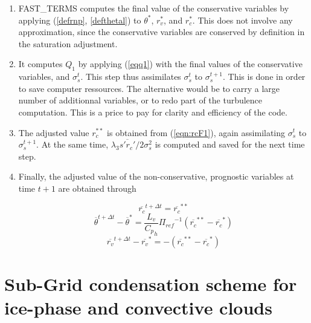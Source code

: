 \begin{enumerate}
\item FAST\_TERMS computes the final value of the conservative variables
by applying (\ref{defrnp}, \ref{defthetal}) to $\theta^*$, $r_v^*$,
and $r_c^*$.
This does not involve any approximation, since the conservative variables
are conserved by definition in the saturation adjustment.

\item It computes $Q_1$ by applying (\ref{eqq1}) with the final values of
the conservative variables, and $\sigma_s^t$. This step thus assimilates
$\sigma_s^t$ to $\sigma_s^{t+1}$. This is done in order to save computer
ressources. The alternative would be to carry a large number of additionnal
variables, or to redo part of the turbulence computation. This is a price
to pay for clarity and efficiency of the code.

\item The adjusted value $r_c^{**}$ is obtained from (\ref{eqn:rcF1}), again
assimilating $\sigma_s^t$ to $\sigma_s^{t+1}$. At the same time,
$\lambda_3 \overline{s'r_c'} / 2 \sigma_s^2$ is
computed and saved for the next time step.

\item Finally, the adjusted value of the non-conservative, prognostic
variables at time $t+1$ are obtained through

\begin{equation}\label{eqn:rct+1}
{\overline{r_{c}}}^{t+\Delta t} = {\overline{r_{c}}}^{**}
\end{equation}
\begin{equation}\label{eqn:thetat+1}
{\overline{\theta}}^{t+\Delta t} - {\overline{\theta}}^{*} =
\dfrac{L_{v}}{{C_{p}}_{h}}{{\Pi}_{ref}}^{-1}
\left( {\overline{r_{c}}}^{**} - {\overline{r_{c}}}^{*} \right)
\end{equation}
\begin{equation}\label{eqn:rvt+1}
{\overline{r_{v}}}^{t+\Delta t} - {\overline{r_{v}}}^{*} =
-\left( {\overline{r_{c}}}^{**} - {\overline{r_{c}}}^{*} \right)
\end{equation}

\end{enumerate}

\section{Sub-Grid condensation scheme for ice-phase and convective clouds}

